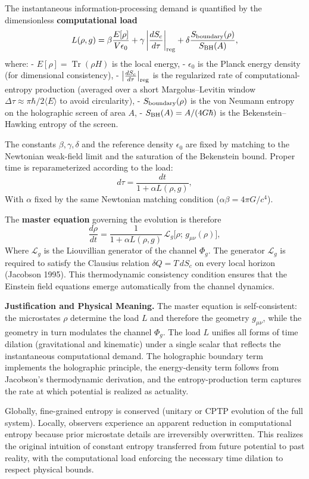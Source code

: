 \documentclass[reprint,amsmath,amssymb,aps,prd,preprintnumbers,superscriptaddress,longbibliography,10pt]{revtex4-2}
\begin{document}
The instantaneous information-processing demand is quantified by the dimensionless \textbf{computational load}
\[
L(\rho,g) = \beta \frac{E[\rho]}{V \epsilon_0} + \gamma \left| \frac{d S_c}{d\tau} \right|_{\rm reg} + \delta \frac{S_{\rm boundary}(\rho)}{S_{\rm BH}(A)},
\]
where:
- \(E[\rho] = \operatorname{Tr}(\rho H)\) is the local energy,
- \(\epsilon_0\) is the Planck energy density (for dimensional consistency),
- \(\left| \frac{d S_c}{d\tau} \right|_{\rm reg}\) is the regularized rate of computational-entropy production (averaged over a short Margolus–Levitin window \(\Delta\tau \approx \pi\hbar / 2\langle E \rangle\) to avoid circularity),
- \(S_{\rm boundary}(\rho)\) is the von Neumann entropy on the holographic screen of area \(A\),
- \(S_{\rm BH}(A) = A / (4G\hbar)\) is the Bekenstein–Hawking entropy of the screen.

The constants \(\beta, \gamma, \delta\) and the reference density \(\epsilon_0\) are fixed by matching to the Newtonian weak-field limit and the saturation of the Bekenstein bound. Proper time is reparameterized according to the load:
\[
d\tau = \frac{dt}{1 + \alpha L(\rho,g)},
\]
With \(\alpha\) fixed by the same Newtonian matching condition (\(\alpha\beta = 4\pi G / c^4\)).

The \textbf{master equation} governing the evolution is therefore
\[
\frac{d\rho}{dt} = \frac{1}{1 + \alpha L(\rho,g)} \,\mathcal{L}_g\bigl[\rho;\, g_{\mu\nu}(\rho)\bigr],
\]
Where \(\mathcal{L}_g\) is the Liouvillian generator of the channel \(\Phi_g\). The generator \(\mathcal{L}_g\) is required to satisfy the Clausius relation \(\delta Q = T\, dS_c\) on every local horizon (Jacobson 1995). This thermodynamic consistency condition ensures that the Einstein field equations emerge automatically from the channel dynamics.

\textbf{Justification and Physical Meaning.} The master equation is self-consistent: the microstates \(\rho\) determine the load \(L\) and therefore the geometry \(g_{\mu\nu}\), while the geometry in turn modulates the channel \(\Phi_g\). The load \(L\) unifies all forms of time dilation (gravitational and kinematic) under a single scalar that reflects the instantaneous computational demand. The holographic boundary term implements the holographic principle, the energy-density term follows from Jacobson’s thermodynamic derivation, and the entropy-production term captures the rate at which potential is realized as actuality.

Globally, fine-grained entropy is conserved (unitary or CPTP evolution of the full system). Locally, observers experience an apparent reduction in computational entropy because prior microstate details are irreversibly overwritten. This realizes the original intuition of constant entropy transferred from future potential to past reality, with the computational load enforcing the necessary time dilation to respect physical bounds.
\end{document}
